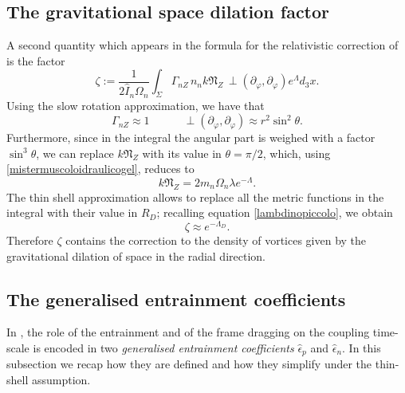 \documentclass[usenatbib%
]{mnras}
\newcommand{\spc}{\quad \quad \quad}
\begin{document}
\subsection{The gravitational space dilation factor}

A second quantity which appears in the formula for the relativistic correction of \cite{sourie_glitch2017} is the factor
\begin{equation}
\zeta := \dfrac{1}{2\hat{I}_n\Omega_n} \int_\Sigma \Gamma_{nZ} \, n_n k \mathfrak{N}_Z \, {\perp}(\partial_\varphi, \partial_\varphi) e^\Lambda d_3 x.
\end{equation} 
Using the slow rotation approximation, we have that
\begin{equation}
\Gamma_{nZ} \approx 1  \spc {\perp}(\partial_\varphi, \partial_\varphi) \approx r^2 \sin^2 \theta.
\end{equation}
Furthermore, since in the integral the angular part is weighed with a factor $\sin^3 \theta$, we can replace $k\mathfrak{N}_Z$ with its value in $\theta = \pi/2$, which, using \eqref{mistermuscoloidraulicogel}, reduces to
\begin{equation}
k\mathfrak{N}_Z = 2 m_n \Omega_n \lambda e^{-\Lambda}.
\end{equation}
The thin shell approximation allows to replace all the metric functions in the integral with their value in $R_D$; recalling equation \eqref{lambdinopiccolo}, we obtain
\begin{equation}\label{prigles}
\zeta \approx e^{-\Lambda_D}.
\end{equation}
Therefore $\zeta$ contains the correction to the density of vortices given by the gravitational dilation of space in the radial direction.

\subsection{The generalised entrainment coefficients}

In \cite{sourie_glitch2017}, the role of the entrainment and of the frame dragging on the coupling time-scale is encoded in two \textit{generalised entrainment coefficients} $\hat{\epsilon}_p$ and $\hat{\epsilon}_n$. In this subsection we recap how they are defined and how they simplify under the thin-shell assumption.
 
\end{document}
